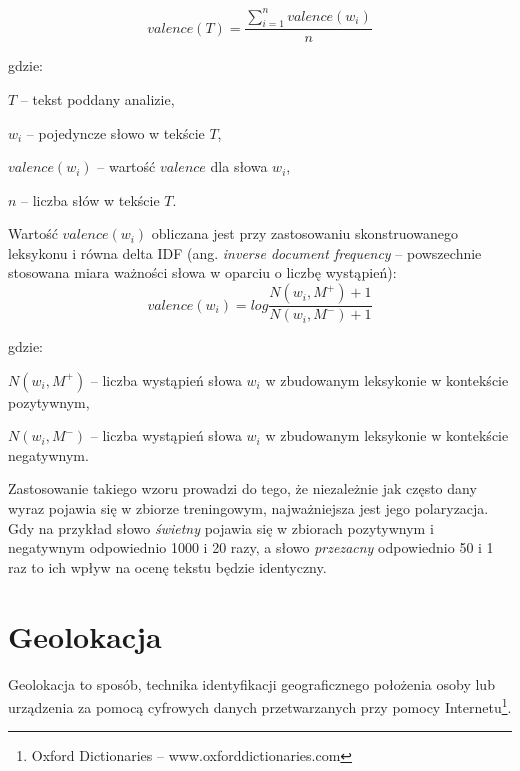 \begin{equation}
valence(T) = \frac{\sum\limits_{i = 1}^n valence(w_i)}{n}
\label{equation:pakparoubek}
\end{equation}

gdzie:

$T$ -- tekst poddany analizie,

$w_i$ -- pojedyncze słowo w tekście $T$,

$valence(w_i)$ -- wartość $valence$ dla słowa $w_i$,

$n$ -- liczba słów w tekście $T$.

\bigskip


Wartość $valence(w_i)$ obliczana jest przy zastosowaniu skonstruowanego
leksykonu i równa delta IDF (ang. \textit{inverse document frequency} -- 
powszechnie stosowana miara ważności słowa w oparciu o liczbę wystąpień):
\begin{equation}
valence(w_i) = log\frac{N(w_i, M^+) + 1}{N(w_i, M^-) + 1}
\end{equation} 

gdzie:

$N(w_i, M^+)$ -- liczba wystąpień słowa $w_i$ w zbudowanym leksykonie w 
kontekście pozytywnym,

$N(w_i, M^-)$ -- liczba wystąpień słowa $w_i$ w zbudowanym leksykonie w 
kontekście negatywnym.

\bigskip
Zastosowanie takiego wzoru prowadzi do tego, że niezależnie jak często
dany wyraz pojawia się w zbiorze treningowym, najważniejsza jest jego polaryzacja.
Gdy na przykład słowo \textit{świetny} pojawia się w zbiorach pozytywnym
i negatywnym odpowiednio 1000 i 20 razy, a słowo \textit{przezacny} odpowiednio
50 i 1 raz to ich wpływ na ocenę tekstu będzie identyczny.




\clearpage\section{Geolokacja}
Geolokacja to sposób, technika identyfikacji geograficznego położenia osoby
lub urządzenia za pomocą cyfrowych danych przetwarzanych przy pomocy 
Internetu\footnote{Oxford Dictionaries -- www.oxforddictionaries.com}.

